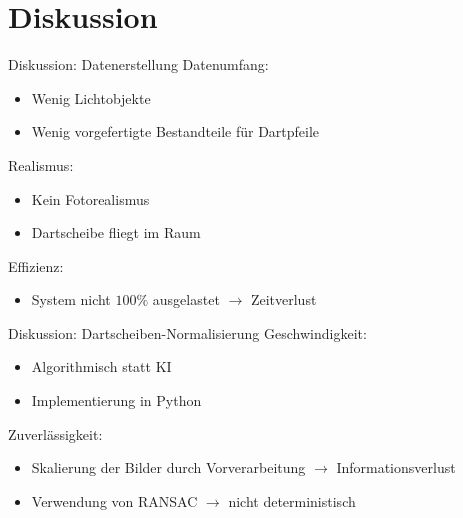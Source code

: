 
\section{Diskussion}

\begin{frame}{Diskussion: Datenerstellung}
    Datenumfang:\\
    \begin{itemize}
        \item Wenig Lichtobjekte
        \item Wenig vorgefertigte Bestandteile für Dartpfeile
    \end{itemize}

    Realismus:\\
    \begin{itemize}
        \item Kein Fotorealismus
        \item Dartscheibe fliegt im Raum
    \end{itemize}

    Effizienz:\\
    \begin{itemize}
        \item System nicht $100\%$ ausgelastet $\rightarrow$ Zeitverlust
    \end{itemize}
\end{frame}

\begin{frame}{Diskussion: Dartscheiben-Normalisierung}
    Geschwindigkeit:\\
    \begin{itemize}
        \item Algorithmisch statt KI
        \item Implementierung in Python
    \end{itemize}

    Zuverlässigkeit:\\
    \begin{itemize}
        \item Skalierung der Bilder durch Vorverarbeitung $\rightarrow$ Informationsverlust
        \item Verwendung von RANSAC $\rightarrow$ nicht deterministisch
    \end{itemize}
\end{frame}

